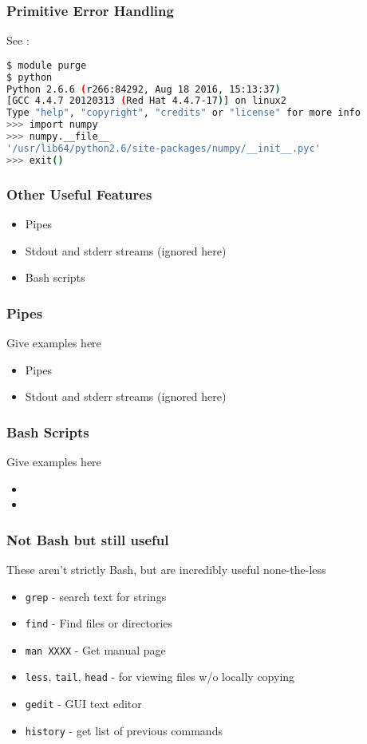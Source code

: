 \documentclass{beamer}
\newcommand{\code}[1]{\colorbox{codegray}{\texttt{#1}}}
\begin{document}
\begin{frame}[fragile]
\frametitle{Primitive Error Handling}
See : 
\begingroup
\scriptsize
\begin{lstlisting}[backgroundcolor = \color{codegray}, language = Bash, showstringspaces=false]
$ module purge
$ python
Python 2.6.6 (r266:84292, Aug 18 2016, 15:13:37)
[GCC 4.4.7 20120313 (Red Hat 4.4.7-17)] on linux2
Type "help", "copyright", "credits" or "license" for more info
>>> import numpy
>>> numpy.__file__
'/usr/lib64/python2.6/site-packages/numpy/__init__.pyc'
>>> exit()
\end{lstlisting}
\endgroup
\end{frame}



\begin{frame}
\frametitle{Other Useful Features}
\begin{itemize}
    \item Pipes 
    \pause
    \item Stdout and stderr streams (ignored here)
    \pause
    \item Bash scripts
    \pause
\end{itemize}
\end{frame}


\begin{frame}
\frametitle{Pipes}
Give examples here
\begin{itemize}
    \item Pipes 
    \pause
    \item Stdout and stderr streams (ignored here)
    \pause
\end{itemize}
\end{frame}


\begin{frame}
\frametitle{Bash Scripts}
Give examples here
\begin{itemize}
    \item 
    \pause
    \item
    \pause
\end{itemize}
\end{frame}


\begin{frame}
\frametitle{Not Bash but still useful}
These aren't strictly Bash, but are incredibly useful none-the-less
\begin{itemize}
    \item \code{grep} - search text for strings
    \pause
    \item \code{find}   - Find files or directories
    \pause
    \item \code{man XXXX} - Get manual page
    \pause
    \item \code{less}, \code{tail}, \code{head} - for viewing files w/o locally copying
    \pause
    \item \code{gedit} - GUI text editor
    \pause
    \item \code{history} - get list of previous commands
    \pause
\end{itemize}
\end{frame}
\end{document}
